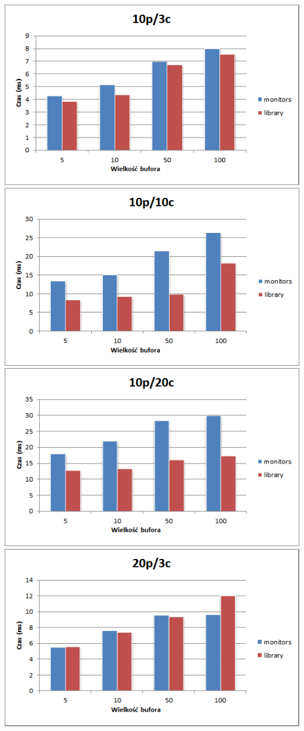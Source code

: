\documentclass[12pt]{article}
\begin{document}
\begin{center}
    \includegraphics[width=\textwidth]{4.png}
    \includegraphics[width=\textwidth]{5.png}
    \includegraphics[width=\textwidth]{6.png}
    \includegraphics[width=\textwidth]{7.png}

\end{center}
\end{document}
